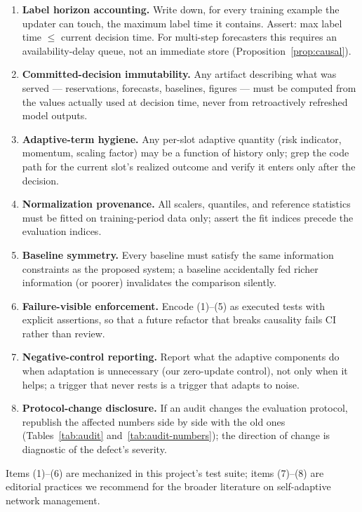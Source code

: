 \begin{enumerate}
\item \textbf{Label horizon accounting.} Write down, for every
training example the updater can touch, the maximum label time it
contains. Assert: max label time $\le$ current decision time. For
multi-step forecasters this requires an availability-delay queue,
not an immediate store (Proposition~\ref{prop:causal}).
\item \textbf{Committed-decision immutability.} Any artifact
describing what was served --- reservations, forecasts, baselines,
figures --- must be computed from the values actually used at
decision time, never from retroactively refreshed model outputs.
\item \textbf{Adaptive-term hygiene.} Any per-slot adaptive quantity
(risk indicator, momentum, scaling factor) may be a function of
history only; grep the code path for the current slot's realized
outcome and verify it enters only after the decision.
\item \textbf{Normalization provenance.} All scalers, quantiles, and
reference statistics must be fitted on training-period data only;
assert the fit indices precede the evaluation indices.
\item \textbf{Baseline symmetry.} Every baseline must satisfy the
same information constraints as the proposed system; a baseline
accidentally fed richer information (or poorer) invalidates the
comparison silently.
\item \textbf{Failure-visible enforcement.} Encode (1)--(5) as
executed tests with explicit assertions, so that a future refactor
that breaks causality fails CI rather than review.
\item \textbf{Negative-control reporting.} Report what the adaptive
components do when adaptation is unnecessary (our zero-update
control), not only when it helps; a trigger that never rests is a
trigger that adapts to noise.
\item \textbf{Protocol-change disclosure.} If an audit changes the
evaluation protocol, republish the affected numbers side by side
with the old ones (Tables~\ref{tab:audit}
and~\ref{tab:audit-numbers}); the direction of change is diagnostic
of the defect's severity.
\end{enumerate}

Items (1)--(6) are mechanized in this project's test suite; items
(7)--(8) are editorial practices we recommend for the broader
literature on self-adaptive network management.
